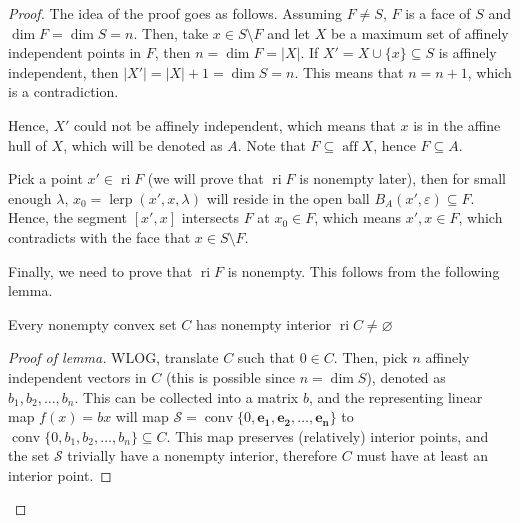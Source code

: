 \begin{proof}
  The idea of the proof goes as follows.
  Assuming \( F \neq  S \), \( F \) is a face of \( S \) and \(
  \dim F = \operatorname{dim} S = n \). Then, take \( x \in S
  \setminus F \) and let \( X \) be a maximum set of affinely independent points
  in \( F \),
  then \( n = \dim F = |X| \).
  If \( X' = X \cup \{x\} \subseteq S   \) is affinely independent, then \( |X'|
  = |X| + 1 = \dim S = n \). This means that \( n = n + 1 \),
  which is a contradiction.

  Hence, \( X' \) could not be affinely independent, which means that \( x \) is
  in the affine hull of \( X \), which will be denoted as \( A \). Note that \(
  F \subseteq \operatorname{aff} X\), hence \( F \subseteq A \).

  Pick a point \( x' \in \operatorname{ri} F \) (we will prove that \(
  \operatorname{ri} F \) is nonempty later), then for small enough \( \lambda
  \), \( x_{0} = \operatorname{lerp}(x', x, \lambda) \) will reside in the open ball \(
  B_{A}(x', \varepsilon) \subseteq F\). Hence, the segment \( [x', x] \)
  intersects \( F \) at \( x_{0} \in F \), which means \( x', x \in F \), which
  contradicts with the face that \( x \in S \setminus F \).

  Finally, we need to prove that \( \operatorname{ri} F \) is nonempty. This
  follows from the following lemma.

  \begin{lemma}
  \label{lem:Nonempty convex set has nonempty interior}
    Every nonempty convex set \( C \) has nonempty interior \( \operatorname{ri}
    C \neq  \varnothing \)
  \end{lemma}

  \begin{proof}[Proof of lemma]
  WLOG, translate \( C \) such that \( 0 \in C \). Then, pick \( n \)
  affinely independent vectors in \( C \) (this is possible since \( n =
  \dim S \)), denoted as \( b_{1}, b_{2}, \ldots , b_{n} \). This
  can be collected into a matrix \( b \), and the representing linear map \(
  f(x) = bx \) will map \( \mathcal{S} = \operatorname{conv} \{0, \mathbf{e_{1}},
  \mathbf{e_{2}}, \ldots, \mathbf{e_{n}} \}   \) to \( \operatorname{conv} \{0,
  b_{1}, b_{2}, \ldots , b_{n}\} \subseteq C   \). This map preserves (relatively)
  interior points, and the set \( \mathcal{S} \) trivially have a nonempty interior,
  therefore \( C \) must have at least an interior point.
  \end{proof}
\end{proof}

